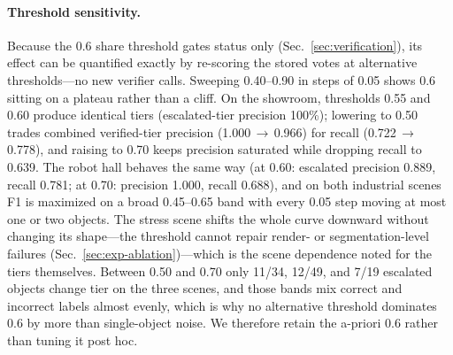 \paragraph{Threshold sensitivity.}
Because the 0.6 share threshold gates status only
(Sec.~\ref{sec:verification}), its effect can be quantified exactly by
re-scoring the stored votes at alternative thresholds---no new verifier
calls. Sweeping 0.40--0.90 in steps of 0.05 shows 0.6 sitting on a
plateau rather than a cliff. On the showroom, thresholds 0.55 and 0.60
produce identical tiers (escalated-tier precision 100\%); lowering to
0.50 trades combined verified-tier precision (1.000\,$\rightarrow$\,0.966)
for recall (0.722\,$\rightarrow$\,0.778), and raising to 0.70 keeps
precision saturated while dropping recall to 0.639. The robot hall
behaves the same way (at 0.60: escalated precision 0.889, recall 0.781;
at 0.70: precision 1.000, recall 0.688), and on both industrial scenes
F1 is maximized on a broad 0.45--0.65 band with every 0.05 step moving
at most one or two objects. The stress scene shifts the whole curve
downward without changing its shape---the threshold cannot repair
render- or segmentation-level failures
(Sec.~\ref{sec:exp-ablation})---which is the scene dependence noted for
the tiers themselves. Between 0.50 and 0.70 only 11/34, 12/49, and 7/19
escalated objects change tier on the three scenes, and those bands mix
correct and incorrect labels almost evenly, which is why no alternative
threshold dominates 0.6 by more than single-object noise. We therefore
retain the a-priori 0.6 rather than tuning it post hoc.

